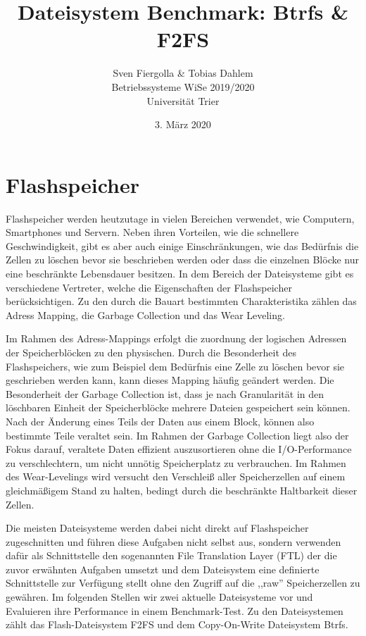 \documentclass[11pt]{article}
\title{Dateisystem Benchmark: Btrfs \& F2FS}
\author{Sven Fiergolla \& Tobias Dahlem\\
Betriebssysteme WiSe 2019/2020\\
Universität Trier}
\date{3. März 2020}
\begin{document}
\maketitle

\section{Flashspeicher}
\label{flash}
Flashspeicher werden heutzutage in vielen Bereichen verwendet, wie Computern, Smartphones und Servern. Neben ihren Vorteilen, wie die schnellere Geschwindigkeit, gibt es aber auch einige Einschränkungen, wie das Bedürfnis die Zellen zu löschen bevor sie beschrieben werden oder dass die einzelnen Blöcke nur eine beschränkte Lebensdauer besitzen. In dem Bereich der Dateisysteme gibt es verschiedene Vertreter, welche die Eigenschaften der Flashspeicher berücksichtigen. Zu den durch die Bauart bestimmten Charakteristika zählen das Adress Mapping, die Garbage Collection und das Wear Leveling.

Im Rahmen des Adress-Mappings erfolgt die zuordnung der logischen Adressen der Speicherblöcken zu den physischen. Durch die Besonderheit des Flashspeichers, wie zum Beispiel dem Bedürfnis eine Zelle zu löschen bevor sie geschrieben werden kann, kann dieses Mapping häufig geändert werden.
Die Besonderheit der Garbage Collection ist, dass je nach Granularität in den löschbaren Einheit der Speicherblöcke mehrere Dateien gespeichert sein können. Nach der Änderung eines Teils der Daten aus einem Block, können also bestimmte Teile veraltet sein. Im Rahmen der Garbage Collection liegt also der Fokus darauf, veraltete Daten effizient auszusortieren ohne die I/O-Performance zu verschlechtern, um nicht unnötig Speicherplatz zu verbrauchen.
Im Rahmen des Wear-Levelings wird versucht den Verschleiß aller Speicherzellen auf einem gleichmäßigem Stand zu halten, bedingt durch die beschränkte Haltbarkeit dieser Zellen.

Die meisten Dateisysteme werden dabei nicht direkt auf Flashspeicher zugeschnitten und führen diese Aufgaben nicht selbst aus, sondern verwenden dafür als Schnittstelle den sogenannten File Translation Layer (FTL) der die zuvor erwähnten Aufgaben umsetzt und dem Dateisystem eine definierte Schnittstelle zur Verfügung stellt ohne den Zugriff auf die ,,raw'' Speicherzellen zu gewähren.
Im folgenden Stellen wir zwei aktuelle Dateisysteme vor und Evaluieren ihre Performance in einem Benchmark-Test. Zu den Dateisystemen zählt das Flash-Dateisystem F2FS und dem Copy-On-Write Dateisystem Btrfs.
\end{document}

